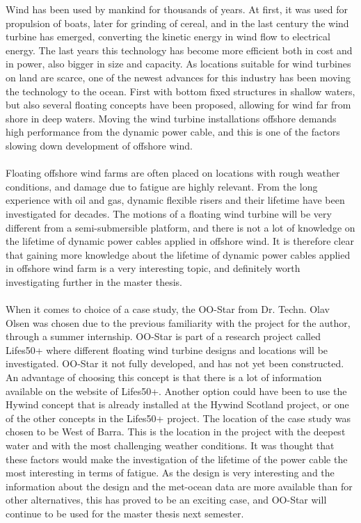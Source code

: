  Wind has been used by mankind for thousands of years. At first, it was used for propulsion of boats, later for grinding of cereal, and in the last century the wind turbine has emerged, converting the kinetic energy in wind flow to electrical energy. The last years this technology has become more efficient both in cost and in power, also bigger in size and capacity. As locations suitable for wind turbines on land are scarce, one of the newest advances for this industry has been moving the technology to the ocean. First with bottom fixed structures in shallow waters, but also several floating concepts have been proposed, allowing for wind far from shore in deep waters. Moving the wind turbine installations offshore demands high performance from the dynamic power cable, and this is one of the factors slowing down development of offshore wind.\\\\ Floating offshore wind farms are often placed on locations with rough weather conditions, and damage due to fatigue are highly relevant. From the long experience with oil and gas, dynamic flexible risers and their lifetime have been investigated for decades. The motions of a floating wind turbine will be very different from a semi-submersible platform, and there is not a lot of knowledge on the lifetime of dynamic power cables applied in offshore wind. It is therefore clear that gaining more knowledge about the lifetime of dynamic power cables applied in offshore wind farm is a very interesting topic, and definitely worth investigating further in the master thesis. \\\\ When it comes to choice of a case study, the OO-Star from Dr. Techn. Olav Olsen was chosen due to the previous familiarity with the project for the author, through a summer internship. OO-Star is part of a research project called Lifes50+ where different floating wind turbine designs and locations will be investigated. OO-Star it not fully developed, and has not yet been constructed. An advantage of choosing this concept is that there is a lot of information available on the website of Lifes50+. Another option could have been to use the Hywind concept that is already installed at the Hywind Scotland project, or one of the other concepts in the Lifes50+ project. The location of the case study was chosen to be West of Barra. This is the location in the project with the deepest water and with the most challenging weather conditions. It was thought that these factors would make the investigation of the lifetime of the power cable the most interesting in terms of fatigue. As the design is very interesting and the information about the design and the met-ocean data are more available than for other alternatives, this has proved to be an exciting case, and OO-Star will continue to be used for the master thesis next semester. 
